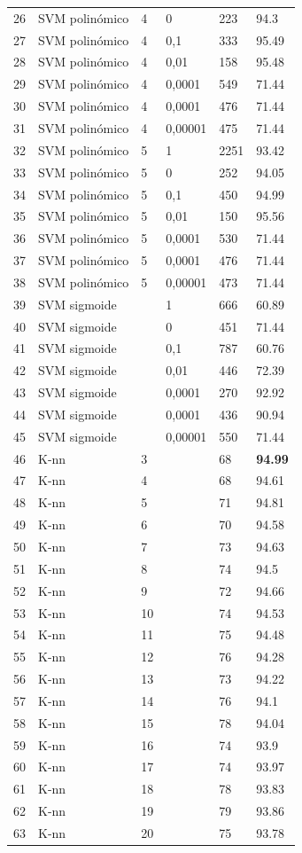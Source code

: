 \documentclass[journal]{IEEEtran}
\begin{document}
\begin{table}[!h]
\begin{tabular}{l | l l l | l l}
	26	&	SVM polinómico 	&	4	&	0	&	223	&	94.3 \\
	27	&	SVM polinómico 	&	4	&	 0,1  	&	333	&	95.49 \\
	28	&	SVM polinómico 	&	4	&	 0,01  	&	158	&	95.48 \\
	29	&	SVM polinómico 	&	4	&	0,0001	&	549	&	71.44 \\
	30	&	SVM polinómico 	&	4	&	 0,0001  	&	476	&	71.44 \\
	31	&	SVM polinómico 	&	4	&	 0,00001  	&	475	&	71.44 \\
	32	&	SVM polinómico 	&	5	&	1	&	2251	&	93.42 \\
	33	&	SVM polinómico 	&	5	&	0	&	252	&	94.05 \\
	34	&	SVM polinómico 	&	5	&	 0,1  	&	450	&	94.99 \\
	35	&	SVM polinómico 	&	5	&	 0,01  	&	150	&	95.56 \\
	36	&	SVM polinómico 	&	5	&	0,0001	&	530	&	71.44 \\
	37	&	SVM polinómico 	&	5	&	 0,0001  	&	476	&	71.44 \\
	38	&	SVM polinómico 	&	5	&	 0,00001  	&	473	&	71.44 \\
	39	&	SVM sigmoide 	&		&	1	&	666	&	60.89 \\
	40	&	SVM sigmoide 	&		&	0	&	451	&	71.44 \\
	41	&	SVM sigmoide 	&		&	 0,1 	&	787	&	60.76 \\
	42	&	SVM sigmoide 	&		&	 0,01 	&	446	&	72.39 \\
	43	&	SVM sigmoide 	&		&	0,0001	&	270	&	92.92 \\
	44	&	SVM sigmoide 	&		&	 0,0001 	&	436	&	90.94 \\
	45	&	SVM sigmoide 	&		&	 0,00001 	&	550	&	71.44 \\
\hline
	46	&	K-nn	&	3	&		&	68	&	\textbf{94.99} \\
	47	&	K-nn	&	4	&		&	68	&	94.61 \\
	48	&	K-nn	&	5	&		&	71	&	94.81 \\
	49	&	K-nn	&	6	&		&	70	&	94.58 \\
	50	&	K-nn	&	7	&		&	73	&	94.63 \\
	51	&	K-nn	&	8	&		&	74	&	94.5 \\
	52	&	K-nn	&	9	&		&	72	&	94.66 \\
	53	&	K-nn	&	10	&		&	74	&	94.53 \\
	54	&	K-nn	&	11	&		&	75	&	94.48 \\
	55	&	K-nn	&	12	&		&	76	&	94.28 \\
	56	&	K-nn	&	13	&		&	73	&	94.22 \\
	57	&	K-nn	&	14	&		&	76	&	94.1 \\
	58	&	K-nn	&	15	&		&	78	&	94.04 \\
	59	&	K-nn	&	16	&		&	74	&	93.9 \\
	60	&	K-nn	&	17	&		&	74	&	93.97 \\
	61	&	K-nn	&	18	&		&	78	&	93.83 \\
	62	&	K-nn	&	19	&		&	79	&	93.86 \\
	63	&	K-nn	&	20	&		&	75	&	93.78 \\
\end{tabular}
\end{table}
\end{document}
